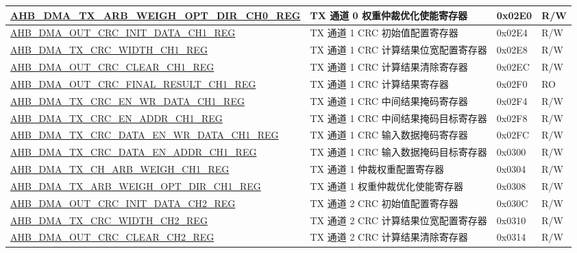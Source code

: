 \begin{longtable}{ | l | l | p{1.3cm} | l | }
\hyperref[regdesc:AHBDMATXARBWEIGHOPTDIRCHNREG]{AHB\_DMA\_TX\_ARB\_WEIGH\_OPT\_DIR\_CH0\_REG} & TX 通道 0 权重仲裁优化使能寄存器 & 0x02E0 & R/W \\ \hline
\hyperref[regdesc:AHBDMAOUTCRCINITDATACHNREG]{AHB\_DMA\_OUT\_CRC\_INIT\_DATA\_CH1\_REG} & TX 通道 1 CRC 初始值配置寄存器 & 0x02E4 & R/W \\ \hline
\hyperref[regdesc:AHBDMATXCRCWIDTHCHNREG]{AHB\_DMA\_TX\_CRC\_WIDTH\_CH1\_REG} & TX 通道 1 CRC 计算结果位宽配置寄存器 & 0x02E8 & R/W \\ \hline
\hyperref[regdesc:AHBDMAOUTCRCCLEARCHNREG]{AHB\_DMA\_OUT\_CRC\_CLEAR\_CH1\_REG} & TX 通道 1 CRC 计算结果清除寄存器 & 0x02EC & R/W \\ \hline
\hyperref[regdesc:AHBDMAOUTCRCFINALRESULTCHNREG]{AHB\_DMA\_OUT\_CRC\_FINAL\_RESULT\_CH1\_REG} & TX 通道 1 CRC 计算结果寄存器 & 0x02F0 & RO \\ \hline
\hyperref[regdesc:AHBDMATXCRCENWRDATACHNREG]{AHB\_DMA\_TX\_CRC\_EN\_WR\_DATA\_CH1\_REG} & TX 通道 1 CRC 中间结果掩码寄存器 & 0x02F4 & R/W \\ \hline
\hyperref[regdesc:AHBDMATXCRCENADDRCHNREG]{AHB\_DMA\_TX\_CRC\_EN\_ADDR\_CH1\_REG} & TX 通道 1 CRC 中间结果掩码目标寄存器 & 0x02F8 & R/W \\ \hline
\hyperref[regdesc:AHBDMATXCRCDATAENWRDATACHNREG]{AHB\_DMA\_TX\_CRC\_DATA\_EN\_WR\_DATA\_CH1\_REG} & TX 通道 1 CRC 输入数据掩码寄存器 & 0x02FC & R/W \\ \hline
\hyperref[regdesc:AHBDMATXCRCDATAENADDRCHNREG]{AHB\_DMA\_TX\_CRC\_DATA\_EN\_ADDR\_CH1\_REG} & TX 通道 1 CRC 输入数据掩码目标寄存器  & 0x0300 & R/W \\ \hline
\hyperref[regdesc:AHBDMATXCHARBWEIGHCHNREG]{AHB\_DMA\_TX\_CH\_ARB\_WEIGH\_CH1\_REG} & TX 通道 1 仲裁权重配置寄存器 & 0x0304 & R/W \\ \hline
\hyperref[regdesc:AHBDMATXARBWEIGHOPTDIRCHNREG]{AHB\_DMA\_TX\_ARB\_WEIGH\_OPT\_DIR\_CH1\_REG} & TX 通道 1 权重仲裁优化使能寄存器 & 0x0308 & R/W \\ \hline
\hyperref[regdesc:AHBDMAOUTCRCINITDATACHNREG]{AHB\_DMA\_OUT\_CRC\_INIT\_DATA\_CH2\_REG} & TX 通道 2 CRC 初始值配置寄存器 & 0x030C & R/W \\ \hline
\hyperref[regdesc:AHBDMATXCRCWIDTHCHNREG]{AHB\_DMA\_TX\_CRC\_WIDTH\_CH2\_REG} & TX 通道 2 CRC 计算结果位宽配置寄存器 & 0x0310 & R/W \\ \hline
\hyperref[regdesc:AHBDMAOUTCRCCLEARCHNREG]{AHB\_DMA\_OUT\_CRC\_CLEAR\_CH2\_REG} & TX 通道 2 CRC 计算结果清除寄存器 & 0x0314 & R/W \\ \hline

\end{longtable}

